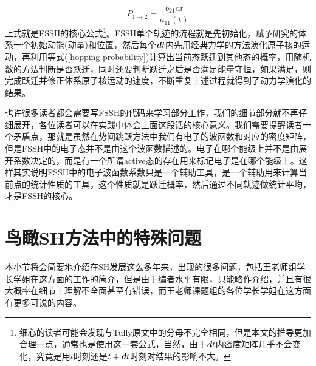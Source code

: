 \documentclass[12pt,a4paper,openany,twoside]{book}
\numberwithin{equation}{section}
\newcommand{\ud}{\mathrm{d}}
\begin{document}
        \begin{equation}
          P_{1\rightarrow2}=\frac{b_{21} \ud t }{ a_{11}(t)}
          \label{hopping probability}
        \end{equation}
        上式就是FSSH的核心公式\footnote{细心的读者可能会发现与Tully原文中的分母不完全相同，但是本文的推导更加合理一点，通常也是使用这一套公式，当然，由于$\vb*{d}t$内密度矩阵几乎不会变化，究竟是用$t$时刻还是$t+\vb*{d}t$时刻对结果的影响不大。}。FSSH单个轨迹的流程就是先初始化，赋予研究的体系一个初始动能(动量)和位置，然后每个$\vb*{d}t$内先用经典力学的方法演化原子核的运动，再利用等式(\ref{hopping probability})计算出当前态跃迁到其他态的概率，用随机数的方法判断是否跃迁，同时还要判断跃迁之后是否满足能量守恒，如果满足，则完成跃迁并修正体系原子核运动的速度，不断重复上述过程就得到了动力学演化的结果。

        也许很多读者都会需要写FSSH的代码来学习部分工作，我们的细节部分就不再仔细展开，各位读者可以在实践中体会上面这段话的核心意义。我们需要提醒读者一个矛盾点，那就是虽然在势间跳跃方法中我们有电子的波函数和对应的密度矩阵，但是FSSH中的电子态并不是由这个波函数描述的。电子在哪个能级上并不是由展开系数决定的，而是有一个所谓active态的存在用来标记电子是在哪个能级上。这样其实说明FSSH中的电子波函数系数只是一个辅助工具，是一个辅助用来计算当前点的统计性质的工具，这个性质就是跃迁概率，然后通过不同轨迹做统计平均，才是FSSH的核心。
        
      \section{鸟瞰SH方法中的特殊问题}
        本小节将会简要地介绍在SH发展这么多年来，出现的很多问题，包括王老师组学长学姐在这方面的工作的简介，但是由于编者水平有限，只能略作介绍，并且有很大概率在细节上理解不全面甚至有错误，而王老师课题组的各位学长学姐在这方面有更多可说的内容。
\end{document}
